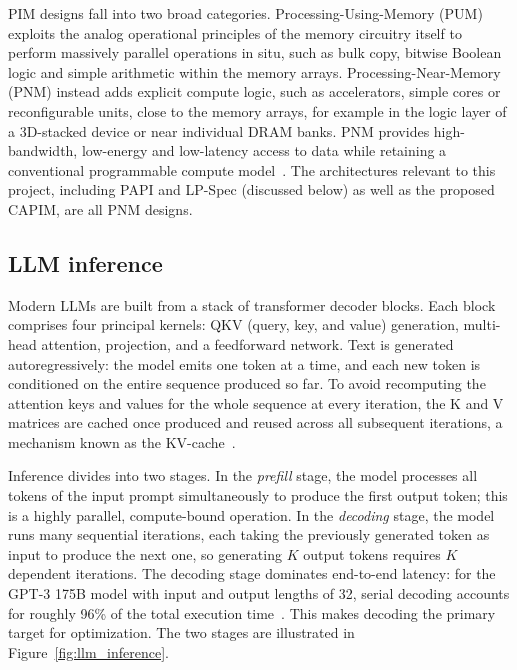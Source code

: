 \documentclass[11pt]{article}
\begin{document}
PIM designs fall into two broad categories. Processing-Using-Memory (PUM) exploits the analog operational principles of the memory circuitry itself to perform massively parallel operations in situ, such as bulk copy, bitwise Boolean logic and simple arithmetic within the memory arrays. Processing-Near-Memory (PNM) instead adds explicit compute logic, such as accelerators, simple cores or reconfigurable units, close to the memory arrays, for example in the logic layer of a 3D-stacked device or near individual DRAM banks. PNM provides high-bandwidth, low-energy and low-latency access to data while retaining a conventional programmable compute model~\cite{mutlu2022primer}. The architectures relevant to this project, including PAPI and LP-Spec (discussed below) as well as the proposed CAPIM, are all PNM designs.

\subsection{LLM inference}
Modern LLMs are built from a stack of transformer decoder blocks. Each block comprises four principal kernels: QKV (query, key, and value) generation, multi-head attention, projection, and a feedforward network. Text is generated autoregressively: the model emits one token at a time, and each new token is conditioned on the entire sequence produced so far. To avoid recomputing the attention keys and values for the whole sequence at every iteration, the K and V matrices are cached once produced and reused across all subsequent iterations, a mechanism known as the KV-cache~\cite{he2025papi}.

Inference divides into two stages. In the \emph{prefill} stage, the model processes all tokens of the input prompt simultaneously to produce the first output token; this is a highly parallel, compute-bound operation. In the \emph{decoding} stage, the model runs many sequential iterations, each taking the previously generated token as input to produce the next one, so generating $K$ output tokens requires $K$ dependent iterations. The decoding stage dominates end-to-end latency: for the GPT-3 175B model with input and output lengths of 32, serial decoding accounts for roughly 96\% of the total execution time~\cite{he2025papi}. This makes decoding the primary target for optimization. The two stages are illustrated in Figure~\ref{fig:llm_inference}.
\end{document}
